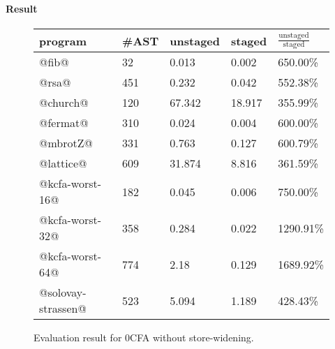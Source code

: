 \iffalse
We used the following benchmark programs:
\begin{itemize}
  \item \textbf{rsa}: The RSA public key encryption algorithm.
  \item \textbf{kcfa3}: A difficult benchmark for $k$-CFA.
  \item \textbf{church}: Church numerals with additions and mutiplications.
  \item \textbf{fermat}: Fermat and Solovay-Strassen primality testing.
  \item \textbf{kcfa-worst-case-}\textit{n}: 
    Benchmark programs that are supposed to be tough cases for $k$-CFA; 
    the number $n$ indicates the depth of nesting lambda terms.
\end{itemize}
\fi

\paragraph{Result}

\begin{figure}[h]
\footnotesize
\begin{tabular}{@{}lllll@{}}
\toprule
    program             &\#AST & unstaged   & staged     & $\frac{\text{unstaged}}{\text{staged}}$ \\ \midrule
    @fib@               & 32   & 0.013      & 0.002      & 650.00\%          \\
    @rsa@               & 451  & 0.232      & 0.042      & 552.38\%          \\
    @church@            & 120  & 67.342     & 18.917     & 355.99\%          \\
    @fermat@            & 310  & 0.024      & 0.004      & 600.00\%          \\
    @mbrotZ@            & 331  & 0.763      & 0.127      & 600.79\%          \\
    @lattice@           & 609  & 31.874     & 8.816      & 361.59\%          \\
    @kcfa-worst-16@     & 182  & 0.045      & 0.006      & 750.00\%          \\
    @kcfa-worst-32@     & 358  & 0.284      & 0.022      & 1290.91\%         \\
    @kcfa-worst-64@     & 774  & 2.18       & 0.129      & 1689.92\%         \\
    @solovay-strassen@  & 523  & 5.094      & 1.189      & 428.43\%          \\
    \bottomrule
\end{tabular}
\caption{Evaluation result for 0CFA without store-widening.} \label{evaluation_result}
\end{figure}

